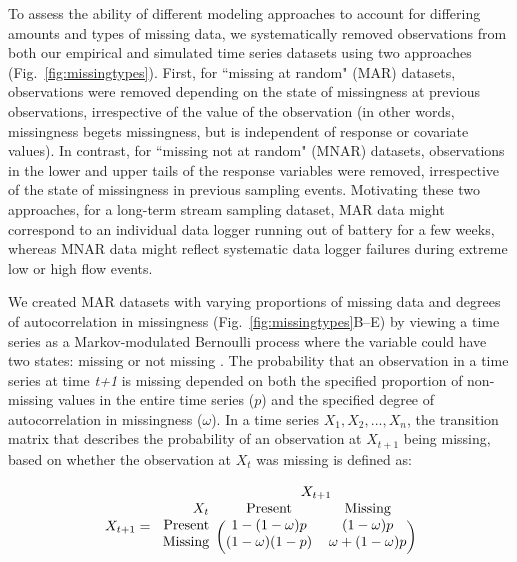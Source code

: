 \documentclass{article}
\begin{document}
To assess the ability of different modeling approaches to account for differing amounts and types of missing data, we systematically removed observations from both our empirical and simulated time series datasets using two approaches (Fig.\ \ref{fig:missingtypes}). First, for ``missing at random" (MAR) datasets, observations were removed depending on the state of missingness at previous observations, irrespective of the value of the observation (in other words, missingness begets missingness, but is independent of response or covariate values). In contrast, for ``missing not at random" (MNAR) datasets, observations in the lower and upper tails of the response variables were removed, irrespective of the state of missingness in previous sampling events. Motivating these two approaches, for a long-term stream sampling dataset, MAR data might correspond to an individual data logger running out of battery for a few weeks, whereas MNAR data might reflect systematic data logger failures during extreme low or high flow events.

We created MAR datasets with varying proportions of missing data and degrees of autocorrelation in missingness (Fig.\ \ref{fig:missingtypes}B--E) by viewing a time series as a Markov-modulated Bernoulli process where the variable could have two states: missing or not missing \citep{Gharib2014, Edwards1960}. The probability that an observation in a time series at time \textit{t+1} is missing depended on both the specified proportion of non-missing values in the entire time series ($p$) and the specified degree of autocorrelation in missingness ($\omega$). In a time series $X_1, X_2, ..., X_n$, the transition matrix that describes the probability of an observation at $X_{t+1}$ being missing, based on whether the observation at $X_t$ was missing is defined as: 

\begin{equation}
X_{t+1}=
\begin{blockarray}{rcccc}
\text{} & \BAmulticolumn{4}{c}{X_{t+1}}\\
X_t & \text{Present} & \text{Missing}  \\
\begin{block}{r(cccc)}
\text{Present} & 1-(1-\omega)p & (1-\omega)p \\
\text{Missing} & (1-\omega)(1-p) & \omega + (1-\omega)p  \\
[1ex]
\end{block}
\end{blockarray}
\end{equation}
\end{document}
